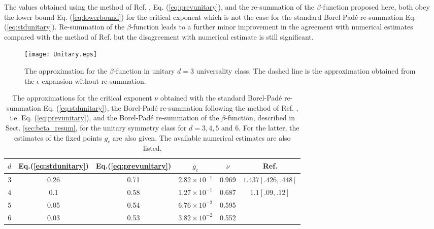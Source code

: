 \documentclass[singlecolumn]{jpsj3}
\begin{document}
The values obtained using the method of Ref. , Eq. (\ref{eq:prevunitary}), and the re-summation of the $\beta$-function
proposed here, both obey the lower bound Eq. (\ref{eq:lowerbound}) for the critical exponent
which is not the case for the standard Borel-Pad\'e re-summation Eq. (\ref{eq:stdunitary}).
Re-summation of the $\beta$-function leads to a further minor improvement in the agreement with numerical estimates compared with the method of Ref.  but the disagreement with numerical estimate is still significant.

\begin{figure}[tb]
\begin{center}
\texttt{[image: Unitary.eps]}
\caption{The approximation for the $\beta$-function in unitary $d=3$ universality class.
The dashed line is the approximation obtained from the $\epsilon$-expansion without re-summation.}
\label{plot:beta_u}
\end{center}
\end{figure}

\begin{table}[ht]
	\begin{center}
	\begin{tabular}{|c||c|c||c|c||c|} \hline
      	$d$ & Eq.(\ref{eq:stdunitary}) & Eq.(\ref{eq:prevunitary}) & $g_c$ & $\nu$ & Ref. \cite{Ujfalusi15a,Ujfalusi15b, Slevin16} \\ \hline
      	$3$ & 0.26 & 0.71 & $2.82\times 10^{-1}$ & 0.969 & $1.437[.426,.448]$ \\ \hline
      	$4$ & 0.1  & 0.58 & $1.27\times 10^{-1}$ & 0.687 & $1.1[.09,.12]$ \\ \hline
      	$5$ & 0.05 & 0.54 & $6.76\times 10^{-2}$ & 0.595 & \\ \hline
      	$6$ & 0.03 & 0.53 & $3.82\times 10^{-2}$ & 0.552 & \\ \hline
	\end{tabular}
	\end{center}
	\caption{
	The approximations for the critical exponent $\nu$ obtained with the standard Borel-Pad\'e re-summation Eq. (\ref{eq:stdunitary}), the Borel-Pad\'e re-summation following the method of Ref. , i.e. Eq. (\ref{eq:prevunitary}), and the Borel-Pad\'e re-summation of the $\beta$-function, described in Sect. \ref{sec:beta_resum}, for the unitary symmetry class for $d=3,4,5$ and $6$. For the latter, the estimates of the fixed points $g_c$ are also given. The available numerical estimates are also listed.
	} \label{table:u_integer_d}
\end{table}
\end{document}
